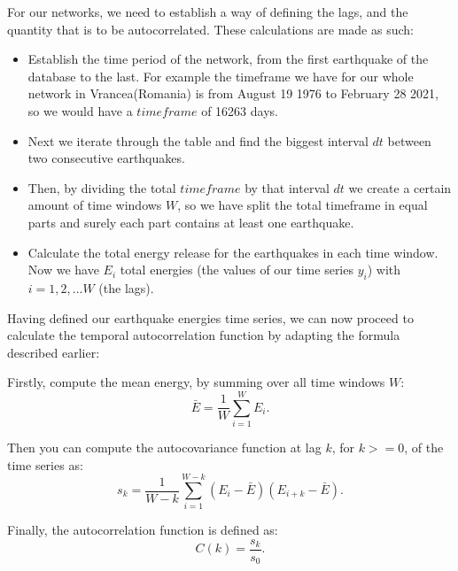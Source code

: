 \begin{frame}
For our networks, we need to establish a way of defining the lags, and the quantity that is to be autocorrelated. These calculations are made as such:

\begin{itemize}
	\item Establish the time period of the network, from the first earthquake of the database to the last. For example the timeframe we have for our whole network in Vrancea(Romania) is from August 19 1976 to  February 28 2021, so we would have a $timeframe$ of 16263 days.
	\item Next we iterate through the table and find the biggest interval $dt$ between two consecutive earthquakes. 
	\item Then, by dividing the total $timeframe$ by that interval $dt$ we create a certain amount of time windows $W$, so we have split the total timeframe in equal parts and surely each part contains at least one earthquake.
	\item Calculate the total energy release for the earthquakes in each time window. Now we have $E_i$ total energies (the values of our time series $y_i$) with $i = 1,2,...W$ (the lags).
\end{itemize}
\end{frame}

\begin{frame}
Having defined our earthquake energies time series, we can now proceed to calculate the temporal autocorrelation function by adapting the formula described earlier:\par


Firstly, compute the mean energy, by summing over all time windows $W$:
\begin{equation}
\bar{E} = \frac{1}{W}\sum_{i=1}^{W}E_i.
\end{equation}

Then you can compute the autocovariance function at lag $k$, for $k>=0$, of the time series as:
\begin{equation}
s_k = \frac{1}{W-k}\sum_{i=1}^{W-k} (E_i-\bar{E})(E_{i+k}-\bar{E}).
\end{equation}

Finally, the autocorrelation function is defined as:
\begin{equation}
C(k) = \frac{s_k}{s_0}.
\end{equation}
\end{frame}


